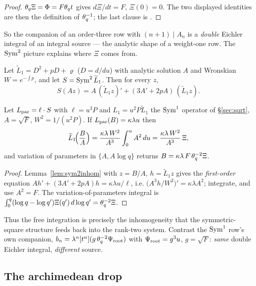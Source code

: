 \begin{proof}
$\theta_q\Xi=\Phi=F\theta_q t$ gives $d\Xi/dt=F$, $\Xi(0)=0$.  The two displayed
identities are then the definition of $\theta_q^{-1}$; the last clause is
\cite{Bogner2013}. \Proved
\end{proof}

So the companion of an order-three row with $(n+1)\mid A_n$ is a \emph{double}
Eichler integral of an integral source --- the analytic shape of a weight-one row.
The $\operatorname{Sym}^2$ picture explains where $\Xi$ comes from.

\begin{lemma}\label{lem:sym2inhom}
Let $\widetilde L_1=D^2+pD+\varrho$ ($D=d/du$) with analytic solution $A$ and
Wronskian $W=e^{-\int p}$, and let $S=\operatorname{Sym}^2\widetilde L_1$.  Then for every $z$,
\[
S(Az)=A\,(\widetilde L_1z)'+(3A'+2pA)\,(\widetilde L_1z).
\]
\end{lemma}

\begin{proposition}\label{prop:WD2}
Let $L_{\rm par}=\ell\cdot S$ with $\ell=u^3P$ and $L_1=u^2P\widetilde L_1$ the
$\operatorname{Sym}^1$ operator of \S\ref{sec:sqrt}, $A=\sqrt F$, $W^2=1/(u^2P)$.  If
$L_{\rm par}(B)=\kappa\lambda u$ then
\[
\widetilde L_1\!\Bigl(\frac{B}{A}\Bigr)=\frac{\kappa\lambda\,W^2}{A^3}\int_0^uA^2\,du
=\frac{\kappa\lambda\,W^2}{A^3}\,\Xi ,
\]
and variation of parameters in $\{A,A\log q\}$ returns
$B=\kappa\lambda\,F\,\theta_q^{-2}\Xi$.
\end{proposition}

\begin{proof}
Lemma~\ref{lem:sym2inhom} with $z=B/A$, $h=\widetilde L_1z$ gives the
\emph{first-order} equation $Ah'+(3A'+2pA)h=\kappa\lambda u/\ell$, i.e.
$\bigl(A^3h/W^2\bigr)'=\kappa\lambda A^2$; integrate, and use $A^2=F$.  The
variation-of-parameters integral is
$\int_0^q(\log q-\log q')\Xi(q')\,d\log q'=\theta_q^{-2}\Xi$. \Proved
\end{proof}

Thus the free integration is precisely the inhomogeneity that the symmetric-square
structure feeds back into the rank-two system.  Contrast the $\operatorname{Sym}^1$ row's own
companion, $b_n=\lambda^n[t^n](g\,\theta_q^{-2}\Psi_{\rm root})$ with
$\Psi_{\rm root}=g^3u$, $g=\sqrt F$: \emph{same} double Eichler integral,
\emph{different} source.

\subsection{The archimedean drop}

